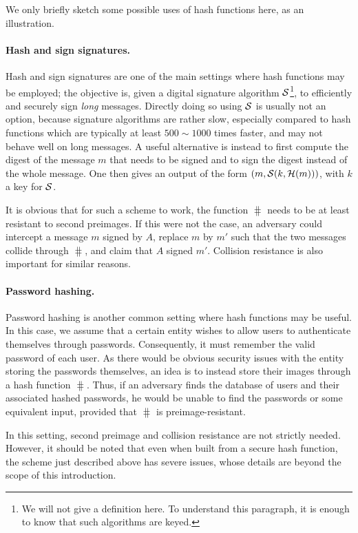 We only briefly sketch some possible uses of hash functions here, as an illustration.

\paragraph{Hash and sign signatures.} Hash and sign signatures are one of the main settings where hash functions may be employed; the objective is, given a digital signature
algorithm $\operatorname{\mathcal{S}}$\footnote{We will not give a definition here. To understand this paragraph, it is enough to know that such algorithms are keyed.}, to efficiently and securely sign \emph{long} messages. Directly doing so using $\operatorname{\mathcal{S}}$ is usually not an option, because signature algorithms are rather slow, especially compared
to hash functions which are typically at least $500 \sim 1000$ times faster, and may not behave well on long messages. A useful alternative is instead to first compute the digest of the
message $m$ that needs to be signed and to sign the digest instead of the whole message. One then gives an output of the form $(m, \operatorname{\mathcal{S}}(k,\operatorname{\mathcal{H}}(m)))$, with $k$ a key for $\operatorname{\mathcal{S}}$. 

It is obvious that for such a scheme to work, the function $\hash$ needs to be at least resistant to second preimages. If this were not the case, an adversary could intercept a message $m$
signed by $A$, replace $m$ by $m'$ such that the two messages collide through $\hash$, and claim that $A$ signed $m'$.
Collision resistance is also important for similar reasons.

\paragraph{Password hashing.} Password hashing is another common setting where hash functions may be useful. In this case, we assume that a certain entity wishes to allow users to authenticate themselves
through passwords. Consequently, it must remember the valid password of each user. As there would be obvious security issues with the entity storing the passwords themselves, an idea
is to instead store their images through a hash function $\hash$. Thus, if an adversary finds the database of users and their associated hashed passwords, he would be unable to find
the passwords or some equivalent input, provided that $\hash$ is preimage-resistant.

In this setting, second preimage and collision resistance are not strictly needed. However, it should be noted that even when built from a secure hash function,
the scheme just described above has severe issues, whose details are beyond the scope of this introduction.


